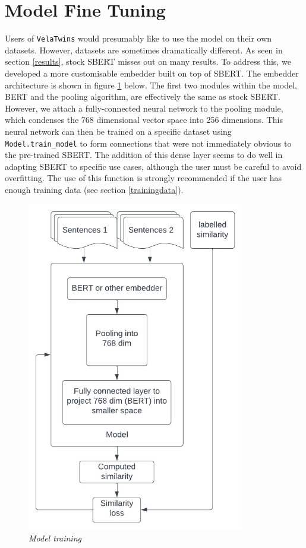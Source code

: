 \documentclass[a4paper]{article}
\begin{document}
\section{Model Fine Tuning}\label{training} Users of \lstinline{VelaTwins} would
presumably like to use the model on their own datasets. However, datasets are
sometimes dramatically different. As seen in section \ref{results}, stock SBERT
misses out on many results. To address this, we developed a more customisable
embedder built on top of SBERT. The embedder architecture is shown in figure
\ref{train} below. The first two modules within the model, BERT and the pooling
algorithm, are effectively the same as stock SBERT. However, we attach a
fully-connected neural network to the pooling module, which condenses the 768
dimensional vector space into 256 dimensions. This neural network can then be
trained on a specific dataset using \lstinline{Model.train_model} to form
connections that were not immediately obvious to the pre-trained SBERT. The
addition of this dense layer seems to do well in adapting SBERT to specific use
cases, although the user must be careful to avoid overfitting. The use of this
function is strongly recommended if the user has enough training data (see
section \ref{trainingdata}).

\begin{figure}[!h]
    \centerline{\includegraphics[width=95mm]{training.jpeg}} \caption{{\it Model training}}
    \label{train}
\end{figure}
\end{document}
